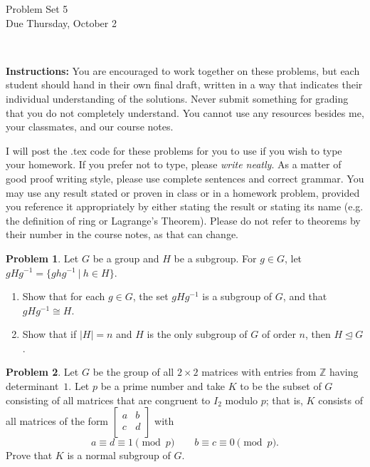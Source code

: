\documentclass[11pt]{article}
\title{}
\date{\vspace{-0.5in}}
\newcommand{\Z}{\mathbb{Z}}
\theoremstyle{definition}
\newtheorem{problem}{Problem}
\begin{document}
\thispagestyle{fancy}
\pagestyle{fancy}

\vspace{3em}

\begin{center}
	{\LARGE Problem Set 5 \\}
	Due Thursday, October 2
\end{center}

\

\noindent
{\bf Instructions:}
You are encouraged to work together on these problems, but each student should hand in their own final draft, written in a way that indicates their individual understanding of the solutions. Never submit something for grading that you do not completely understand. You cannot use any resources besides me, your classmates, and our course notes.


I will post the .tex code for these problems for you to use if you wish to type your homework. If you prefer not to type, please  {\em write neatly}. As a matter of good proof writing style, please use complete sentences and correct grammar. You may use any result stated or proven in class or in a homework problem, provided you reference it appropriately by either stating the result or stating its name (e.g. the definition of ring or Lagrange's Theorem). Please do not refer to theorems by their number in the course notes, as that can change.


\smallskip



\begin{problem} 
Let $G$ be a group and $H$ be a subgroup. For $g\in G$, let $gHg^{-1} = \{ ghg^{-1} \ | \ h\in H\}$.
\begin{enumerate}[(1.1)]
\item Show that for each $g\in G$, the set $gHg^{-1}$ is a subgroup of $G$, and that $gHg^{-1} \cong H$.
\item Show that if $|H|=n$ and $H$ is the only subgroup of $G$ of order $n$, then $H\trianglelefteq G$.
\end{enumerate}
\end{problem} 

\smallskip

\begin{problem}
 Let $G$ be the group of all $2 \times 2$ matrices with entries from $\Z$ having determinant~$1$. Let $p$ be a prime number and take $K$ to be the subset of $G$ consisting
      of all matrices that are congruent to $I_2$ modulo $p$; that is, $K$ consists of all matrices
      of the form $\begin{bmatrix} a & b \\ c & d \\ \end{bmatrix}$ with \[a \equiv d \equiv 1 \pmod{p} \qquad b \equiv c \equiv 0 \pmod{p}.\]  Prove that
      $K$ is a normal subgroup of $G$.
      \end{problem}
      
\end{document}
